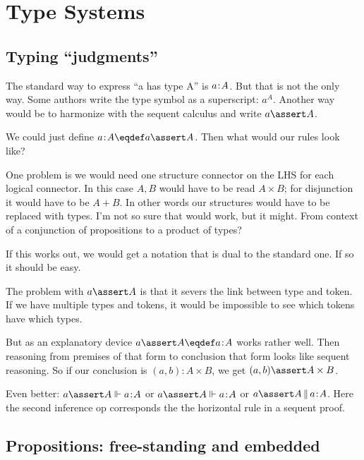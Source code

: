 \documentclass{article}
\begin{document}
\section{Type Systems}

\subsection{Typing ``judgments''}

The standard way to express ``a has type A'' is \(a\hspace{-2pt}:\hspace{-2pt}A\). But that is
not the only way. Some authors write the type symbol as a superscript:
\(a^A\). Another way would be to harmonize with the sequent calculus
and write \(a\linfer A\).

We could just define \(\tj{a}{A}\eqdef a\linfer A\). Then what would our
rules look like?


One problem is we would need one structure connector on the LHS for
each logical connector. In this case \(A,B\) would have to be read
\(A\times B\); for disjunction it would have to be \(A\plus B\). In
other words our structures would have to be replaced with types. I'm
not so sure that would work, but it might. From context of a
conjunction of propositions to a product of types?


If this works out, we would get a notation that is dual to the
standard one. If so it should be easy.

The problem with \(a\linfer A\) is that it severs the link between type
and token. If we have multiple types and tokens, it would be
impossible to see which tokens have which types.

But as an explanatory device \(a\lso A\eqdef \tj{a}{A}\) works rather
well. Then reasoning from premises of that form to conclusion that
form looks like sequent reasoning. So if our conclusion is
\((a,b):A\times B\), we get \( (a,b)\lso A\times B\).

Even better: \(a\lso A\pso\tj{a}{A}\) or \(a\lso A\Vdash\tj{a}{A}\) or
\(a\lso A\,\Vert\,\tj{a}{A}\). Here the second inference op corresponds
the the horizontal rule in a sequent proof.

\subsection{Propositions: free-standing and embedded}
\end{document}

